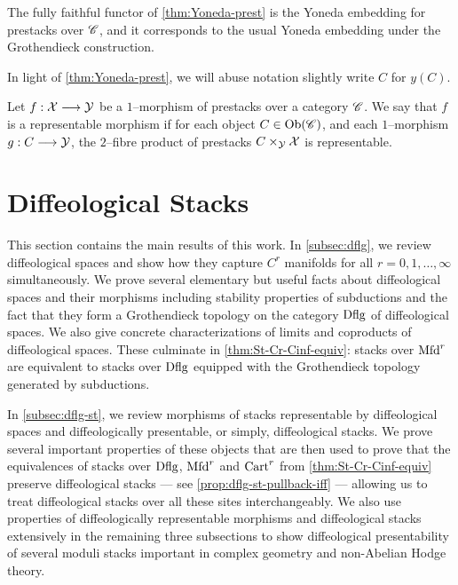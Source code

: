 \documentclass[11pt]{amsart}
\begin{document}
\begin{rmk}
The fully faithful functor of \cref{thm:Yoneda-prest} is the Yoneda embedding for prestacks over
$\mathscr{C}$, and it corresponds to the usual Yoneda embedding under the Grothendieck construction.
\end{rmk}

\begin{notn}
In light of \cref{thm:Yoneda-prest}, we will abuse notation slightly write
$C$ for $y(C)$.
\end{notn}

\begin{defn}\label{defn:rep-morphism}
Let $f : \mcX \to \mcY$ be a $1$--morphism of prestacks over a category $\mathscr{C}$.
We say that $f$ is a representable morphism if for each object $C \in \Ob{\sC}$,
and each $1$--morphism $g : C \to \mcY$, the $2$--fibre product of prestacks
$C \times_\mathcal{Y} \mathcal{X}$ is representable.
\end{defn}



\section{Diffeological Stacks}
\label{sec:dflg-st}

This section contains the main results of this work.
In \cref{subsec:dflg}, we review diffeological spaces and show how they capture $C^r$ manifolds for
all $r = 0, 1, \dots, \infty$ simultaneously.
We prove several elementary but useful facts about diffeological spaces and their morphisms
including stability properties of subductions and the fact that they form a Grothendieck topology
on the category $\mathrm{Dflg}$ of diffeological spaces. We also give concrete
characterizations of limits and coproducts of diffeological spaces.
These culminate in \cref{thm:St-Cr-Cinf-equiv}: stacks over $\mathrm{Mfd}^r$
are equivalent to stacks over $\mathrm{Dflg}$ equipped with the Grothendieck topology generated by
subductions.

In \cref{subsec:dflg-st}, we review morphisms of stacks representable by diffeological spaces and
diffeologically presentable, or simply, diffeological stacks.
We prove several important properties of these objects that are then used to prove that
the equivalences of stacks over $\mathrm{Dflg}$, $\mathrm{Mfd}^r$ and $\mathrm{Cart}^r$ from \cref{thm:St-Cr-Cinf-equiv}
preserve diffeological stacks --- see \cref{prop:dflg-st-pullback-iff} --- allowing us to treat
diffeological stacks over all these sites interchangeably.
We also use properties of diffeologically representable morphisms and diffeological stacks
extensively in the remaining three subsections to show diffeological presentability of several
moduli stacks important in complex geometry and non-Abelian Hodge theory.
\end{document}
